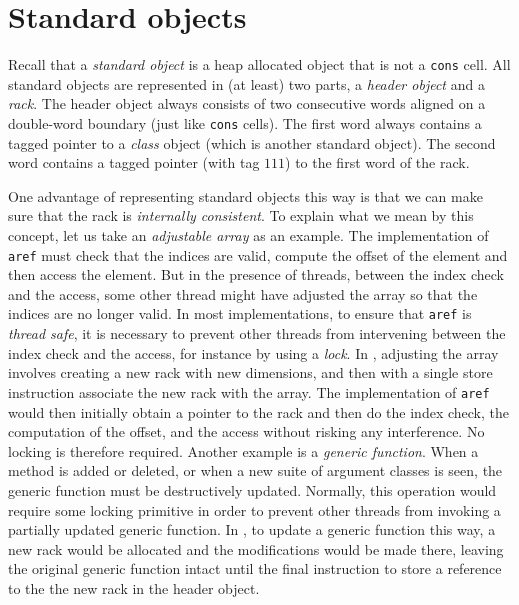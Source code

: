 \section{Standard objects}
\label{sec-data-representation-standard-object}

Recall that a \emph{standard object} is a heap allocated object that
is not a \texttt{cons} cell.  All standard objects are represented in
(at least) two parts, a \emph{header object} and a \emph{rack}.  The
header object always consists of two consecutive words aligned on a
double-word boundary (just like \texttt{cons} cells).  The first word
always contains a tagged pointer to a \emph{class} object (which is
another standard object).  The second word contains a tagged pointer
(with tag $111$) to the first word of the rack.

One advantage of representing standard objects this way is that we can
make sure that the rack is \emph{internally consistent}.  To explain
what we mean by this concept, let us take an \emph{adjustable array}
as an example.  The implementation of \texttt{aref} must check that
the indices are valid, compute the offset of the element and then
access the element.  But in the presence of threads, between the index
check and the access, some other thread might have adjusted the array
so that the indices are no longer valid.  In most implementations, to
ensure that \texttt{aref} is \emph{thread safe}, it is necessary to
prevent other threads from intervening between the index check and the
access, for instance by using a \emph{lock}.  In \sysname{}, adjusting
the array involves creating a new rack with new dimensions, and then
with a single store instruction associate the new rack with the array.
The implementation of \texttt{aref} would then initially obtain a
pointer to the rack and then do the index check, the computation of
the offset, and the access without risking any interference.  No
locking is therefore required.  Another example is a \emph{generic
  function}.  When a method is added or deleted, or when a new suite
of argument classes is seen, the generic function must be
destructively updated.  Normally, this operation would require some
locking primitive in order to prevent other threads from invoking a
partially updated generic function.  In \sysname{}, to update a
generic function this way, a new rack would be allocated and the
modifications would be made there, leaving the original generic
function intact until the final instruction to store a reference to
the the new rack in the header object.

